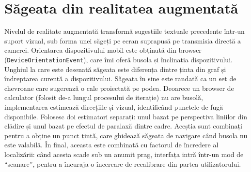 \section{Săgeata din realitatea augmentată}
Nivelul de realitate augmentată transformă sugestiile textuale precedente într-un suport vizual, sub forma unei săgeți pe ecran suprapusă pe transmisia directă a camerei. Orientarea dispozitivului mobil este obținută din browser (\texttt{DeviceOrientationEvent}), care îmi oferă busola și înclinația dispozitivului. Unghiul la care este desenată săgeata este diferența dintre ținta din graf și îndreptarea curentă a dispozitivului. Săgeata în sine este randată ca un set de chevroane care sugerează o cale proiectată pe podea.
Deoarece un browser de calculator (folosit de-a lungul procesului de iterație) nu are busolă, implementarea estimează direcțiile și vizual, identificând punctele de fugă disponibile. Folosesc doi estimatori separați: unul bazat pe perspectiva liniilor din clădire și unul bazat pe efectul de paralaxă dintre cadre. Aceștia sunt combinați pentru a obține un punct țintă, care ghidează săgeata de navigare când busola nu este valabilă. În final, aceasta este combinată cu factorul de încredere al localizării: când acesta scade sub un anumit prag, interfața intră într-un mod de ``scanare'', pentru a încuraja o încercare de recalibrare din partea utilizatorului.
